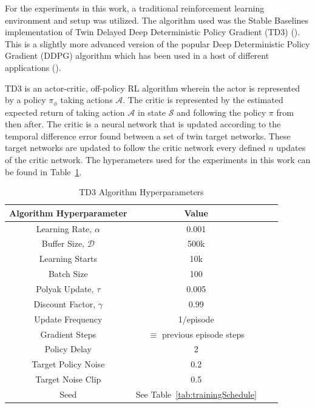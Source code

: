 \documentclass{ifacconf}
\begin{document}
   For the experiments in this work, a traditional reinforcement learning environment and setup was utilized. The algorithm used was the Stable Baselines implementation of Twin Delayed Deep Deterministic Policy Gradient (TD3) (\cite{Fujimoto2018d}). This is a slightly more advanced version of the popular Deep Deterministic Policy Gradient (DDPG) algorithm which has been used in a host of different applications (\cite{Lillicrap2016h, Bhagat2019e, Dwiel2019d, Ha2018a, Cui2019e}).
   
   TD3 is an actor-critic, off-policy RL algorithm wherein the actor is represented by a policy $\pi_{\phi}$ taking actions $\mathcal{A}$. The critic is represented by the estimated expected return of taking action $\mathcal{A}$ in state $\mathcal{S}$ and following the policy $\pi$ from then after. The critic is a neural network that is updated according to the temporal difference error found between a set of twin target networks. These target networks are updated to follow the critic network every defined $n$ updates of the critic network. The hyperameters used for the experiments in this work can be found in Table~\ref{tab:AlgorithmHyperameters}.

   \begin{table}[tb]
      \begin{center}
      \caption{TD3 Algorithm Hyperparameters}\label{tab:AlgorithmHyperameters}
         \begin{tabular}{cccc}
            \hline
            \hline 
            Algorithm Hyperparameter & Value \\ 
            \hline 
            Learning Rate, $\alpha$ & 0.001 \\ 
            Buffer Size, $\mathcal{D}$ & 500k \\ 
            Learning Starts & 10k \\ 
            Batch Size & 100 \\
            Polyak Update, $\tau$ & 0.005 \\
            Discount Factor, $\gamma$ & 0.99 \\ 
            Update Frequency & 1/episode \\
            Gradient Steps & $\equiv$ previous episode steps \\
            Policy Delay & 2 \\
            Target Policy Noise & 0.2 \\
            Target Noise Clip & 0.5 \\
            Seed & See Table~\ref{tab:trainingSchedule} \\
            \hline \hline
         \end{tabular}
      \end{center}
   \end{table}
\end{document}
